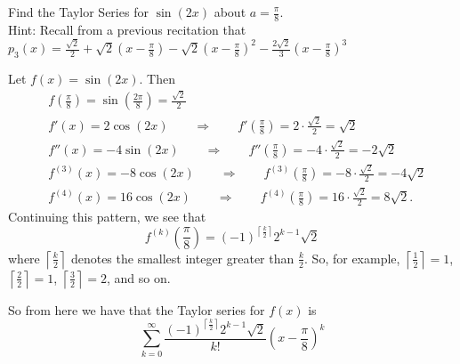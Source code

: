 \documentclass[handout]{ximera}
\begin{document}
\begin{problem}
 Find the Taylor Series for $\sin(2x)$ about $a = \frac{\pi}{8}$.  \\
		Hint: Recall from a previous recitation that \\
		$p_3(x) = \frac{\sqrt{2}}{2} + \sqrt{2} \left( x - \frac{\pi}{8} \right) - \sqrt{2} \left( x - \frac{\pi}{8} \right)^2 -\frac{2 \sqrt{2}}{3} \left( x - \frac{\pi}{8} \right)^3 $
\begin{freeResponse}
	Let $f(x) = \sin(2x)$.  Then
		\begin{align*}
		&f \left( \frac{\pi}{8} \right) = \sin \left( \frac{2\pi}{8} \right) = \frac{\sqrt{2}}{2}  \\
		&f'(x) = 2 \cos(2x) 	\qquad \Longrightarrow 	\qquad	f'\left( \frac{\pi}{8} \right) = 2 \cdot \frac{\sqrt{2}}{2} = \sqrt{2}  \\
		&f''(x) = -4 \sin(2x) 		\qquad	\Longrightarrow	\qquad f''\left( \frac{\pi}{8} \right) = -4 \cdot \frac{\sqrt{2}}{2} = -2 \sqrt{2}  \\
		&f^{(3)}(x) = -8 \cos(2x)	\qquad	\Longrightarrow	\qquad f^{(3)}\left( \frac{\pi}{8} \right) = -8 \cdot \frac{\sqrt{2}}{2} = -4 \sqrt{2}  \\
		&f^{(4)}(x) = 16 \cos(2x) \qquad 	\Longrightarrow	\qquad f^{(4)}\left( \frac{\pi}{8} \right) =16 \cdot \frac{\sqrt{2}}{2}  = 8 \sqrt{2}.
		\end{align*}
	Continuing this pattern, we see that
		\[
		f^{(k)} \left( \frac{\pi}{8} \right) = (-1)^{\left\lceil \frac{k}{2} \right\rceil } 2^{k-1} \sqrt{2}
		\]
	where $\left\lceil \frac{k}{2} \right\rceil$ denotes the smallest integer greater than $\frac{k}{2}$.  
	So, for example, $\left\lceil \frac{1}{2} \right\rceil = 1$, $\left\lceil \frac{2}{2} \right\rceil = 1$, $\left\lceil \frac{3}{2} \right\rceil = 2$, and so on.  
	
	So from here we have that the Taylor series for $f(x)$ is
		\[
		\boxed{\sum_{k=0}^\infty \frac{(-1)^{\left\lceil \frac{k}{2} \right\rceil } 2^{k-1} \sqrt{2}}{k!} \left( x - \frac{\pi}{8} \right)^k}
		\]
\end{freeResponse}

\end{problem}












	
	
	
	
	
	
	
	
	

	










								
				
				
	
\end{document}
